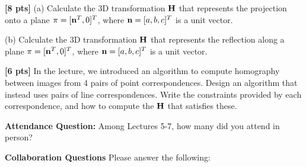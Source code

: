 \documentclass[11pt,addpoints,answers]{exam}
\numberwithin{equation}{section} %
\numberwithin{figure}{section} %
\numberwithin{table}{section} %
\begin{document}
\begin{questions}
\begin{tcolorbox}[height fill, width=\textwidth, blank, borderline={0.5pt}{-2pt},halign=left, valign=top, nobeforeafter, size=normal]



\end{tcolorbox}

\question \textbf{[8 pts]} (a) Calculate the 3D transformation $\mathbf{H}$ that represents the projection onto a plane $\pi = [\mathbf{n}^T, 0]^T$, where $\mathbf{n} = [a,b,c]^T$ is a unit vector.

(b) Calculate the 3D transformation $\mathbf{H}$ that represents the reflection along a plane $\pi = [\mathbf{n}^T, 0]^T$, where $\mathbf{n} = [a,b,c]^T$ is a unit vector.

\begin{tcolorbox}[height fill, width=\textwidth, blank, borderline={0.5pt}{-2pt},halign=left, valign=top, nobeforeafter, size=normal]



\end{tcolorbox}

\question \textbf{[6 pts]} In the lecture, we introduced an algorithm to compute homography between images from 4 pairs of point correspondences. Design an algorithm that instead uses pairs of line correspondences. Write the constraints provided by each correspondence, and how to compute the $\mathbf{H}$ that satisfies these.

\begin{tcolorbox}[height fill, width=\textwidth, blank, borderline={0.5pt}{-2pt},halign=left, valign=top, nobeforeafter, size=normal]



\end{tcolorbox}


\end{questions}

\clearpage
\textbf{Attendance Question:} Among Lectures 5-7, how many did you attend in person?

\begin{tcolorbox}[fit,height=1cm,blank, borderline={1pt}{-2pt},nobeforeafter]
\end{tcolorbox}

\textbf{Collaboration Questions} Please answer the following:
\end{document}
